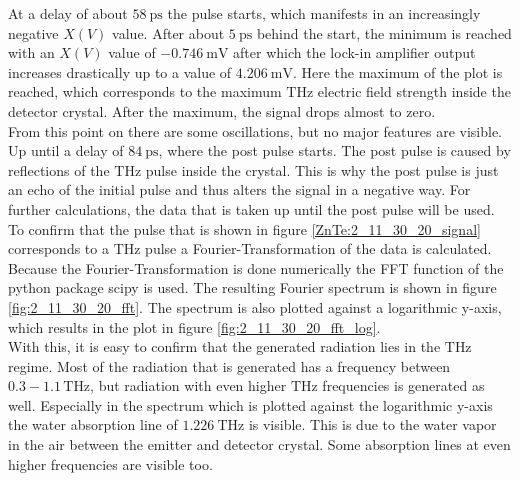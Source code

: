 At a delay of about $\SI{58}{\pico\second}$ the pulse starts, which manifests in an increasingly negative $X(V)$ value.
After about $\SI{5}{\pico\second}$ behind the start, the minimum is reached with an $X(V)$ value of $\SI{-0.746}{\milli\V}$ after which the lock-in amplifier output increases drastically up to a value of $\SI{4.206}{\milli\V}$.
Here the maximum of the plot is reached, which corresponds to the maximum $\si{\tera\hertz}$ electric field strength inside the detector crystal.
After the maximum, the signal drops almost to zero.
\\
From this point on there are some oscillations, but no major features are visible. %
Up until a delay of $\SI{84}{\pico\second}$, where the post pulse starts.
The post pulse is caused by reflections of the $\si{\tera\hertz}$ pulse inside the crystal.
This is why the post pulse is just an echo of the initial pulse and thus alters the signal in a negative way.
For further calculations, the data that is taken up until the post pulse will be used.
\\
\FloatBarrier
To confirm that the pulse that is shown in figure \ref{ZnTe:2_11_30_20_signal} corresponds to a $\si{\tera\hertz}$ pulse a Fourier-Transformation of the data is calculated. %
Because the Fourier-Transformation is done numerically the FFT function of the python package scipy \cite{scipy} is used.
The resulting Fourier spectrum is shown in figure \ref{fig:2_11_30_20_fft}.
The spectrum is also plotted against a logarithmic y-axis, which results in the plot in figure \ref{fig:2_11_30_20_fft_log}.
\\
With this, it is easy to confirm that the generated radiation lies in the $\si{\tera\hertz}$ regime.
Most of the radiation that is generated has a frequency between $0.3-1.1\,\si{\tera\hertz}$, but radiation with even higher $\si{\tera\hertz}$ frequencies is generated as well.
Especially in the spectrum which is plotted against the logarithmic y-axis the water absorption line of $\SI{1.226}{\tera\hertz}$ is visible.
This is due to the water vapor in the air between the emitter and detector crystal.
Some absorption lines at even higher frequencies are visible too.
